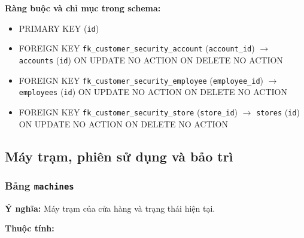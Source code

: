\textbf{Ràng buộc và chỉ mục trong schema:}

\begin{itemize}

\item PRIMARY KEY (\texttt{id})

\item FOREIGN KEY \texttt{fk\_customer\_security\_account} (\texttt{account\_id}) $\rightarrow$ \texttt{accounts} (\texttt{id}) ON UPDATE NO ACTION ON DELETE NO ACTION

\item FOREIGN KEY \texttt{fk\_customer\_security\_employee} (\texttt{employee\_id}) $\rightarrow$ \texttt{employees} (\texttt{id}) ON UPDATE NO ACTION ON DELETE NO ACTION

\item FOREIGN KEY \texttt{fk\_customer\_security\_store} (\texttt{store\_id}) $\rightarrow$ \texttt{stores} (\texttt{id}) ON UPDATE NO ACTION ON DELETE NO ACTION

\end{itemize}

\subsection{Máy trạm, phiên sử dụng và bảo trì}

\subsubsection{Bảng \texttt{machines}}

\textbf{Ý nghĩa:} Máy trạm của cửa hàng và trạng thái hiện tại.\par

\textbf{Thuộc tính:}

